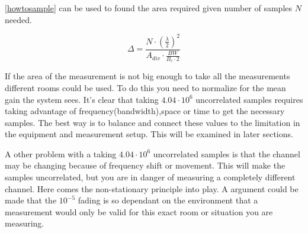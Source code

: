
\autoref{howtosample} can be used to found the area required given number of samples $N$ needed.

\begin{equation}
\Delta  = \frac{N\cdot (\frac{\lambda}{2})^2}{A_{div}\cdot \frac{BW}{B_c \cdot 2}}
\label{howtosqaure}
\end{equation}

If the area of the measurement is not big enough to take all the measurements different rooms could be used. To do this you need to normalize for the mean gain the system sees. It's clear that taking $4.04\cdot10^6$  uncorrelated samples requires taking advantage of  frequency(bandwidth),space or time to get the necessary samples. The best way is to balance and connect these values to the limitation in the equipment and measurement setup. This will be examined in later sections. 

A other problem with a taking $4.04\cdot10^6$  uncorrelated samples is that the channel may be changing because of frequency shift or movement. This will make the samples uncorrelated, but you are in danger of measuring a completely different channel. Here comes the non-stationary principle into play. A argument could be made that the $10^{-5}$ fading is so dependant on the environment that a measurement would only be valid for this exact room or situation you are measuring.

